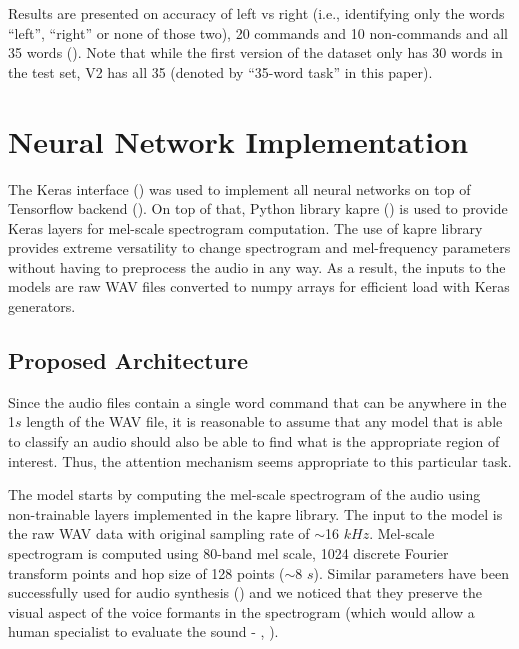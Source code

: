\documentclass[authoryear, review, 12pt, 3p]{elsarticle}
\begin{document}
Results are presented on accuracy of left vs right (i.e., identifying only the words ``left'', ``right'' or none of those two), 20 commands and 10 non-commands and all 35 words (\cite{DBLP:journals/corr/abs-1710-08377}). Note that while the first version of the dataset only has 30 words in the test set, V2 has all 35 (denoted by  ``35-word task'' in this paper).









\section{Neural Network Implementation}
\label{secNNModels}

The Keras interface (\cite{chollet2015keras}) was used to implement all neural networks on top of Tensorflow backend (\cite{tensorflow2015-whitepaper}). On top of that, Python library kapre (\cite{choi2017kapre}) is used to provide Keras layers for mel-scale spectrogram computation. The use of kapre library provides extreme versatility to change spectrogram and mel-frequency parameters without having to preprocess the audio in any way. As a result, the inputs to the models are raw WAV files converted to numpy arrays for efficient load with Keras generators.





\subsection{Proposed Architecture}
\label{secPropArchit}

Since the audio files contain a single word command that can be anywhere in the 1$s$ length of the WAV file, it is reasonable to assume that any model that is able to classify an audio should also be able to find what is the appropriate region of interest. Thus, the attention mechanism seems appropriate to this particular task.

The model starts by computing the mel-scale spectrogram of the audio using non-trainable layers implemented in the kapre library. The input to the model is the raw WAV data with original sampling rate of $\sim$16 $kHz$. Mel-scale spectrogram is computed using 80-band mel scale, 1024 discrete Fourier transform points and hop size of 128 points ($\sim$8 $s$). Similar parameters have been successfully used for audio synthesis (\cite{DBLP:journals/corr/WangSSWWJYXCBLA17}) and we noticed that they preserve the visual aspect of the voice formants in the spectrogram (which would allow a human specialist to evaluate the sound - \cite{Sundberg2013278}, \cite{Sundberg2015418}).
\end{document}
